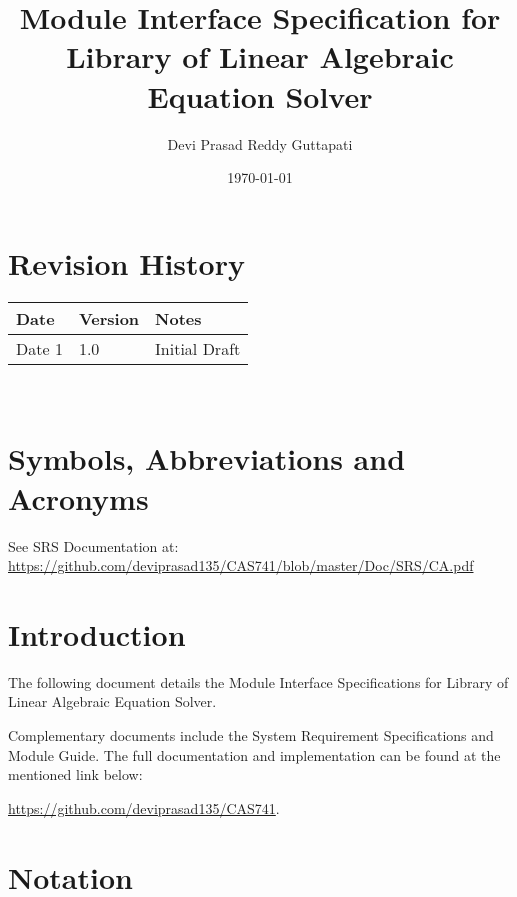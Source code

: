 \documentclass[12pt, titlepage]{article}
\begin{document}
\title{Module Interface Specification for Library of Linear Algebraic Equation Solver}

\author{Devi Prasad Reddy Guttapati}

\date{\today}

\maketitle


\section{Revision History}

\begin{tabularx}{\textwidth}{p{3cm}p{2cm}X}
\toprule {\bf Date} & {\bf Version} & {\bf Notes}\\
\midrule
Date 1 & 1.0 & Initial Draft\\

\bottomrule
\end{tabularx}

~\newpage

\section{Symbols, Abbreviations and Acronyms}

See SRS Documentation at:  \url{https://github.com/deviprasad135/CAS741/blob/master/Doc/SRS/CA.pdf}


\newpage

\tableofcontents

\newpage


\section{Introduction}

The following document details the Module Interface Specifications for Library of Linear Algebraic Equation Solver. 

Complementary documents include the System Requirement Specifications
and Module Guide.  The full documentation and implementation can be
found at the mentioned link below:

\url{https://github.com/deviprasad135/CAS741}.  

\section{Notation}
\end{document}
